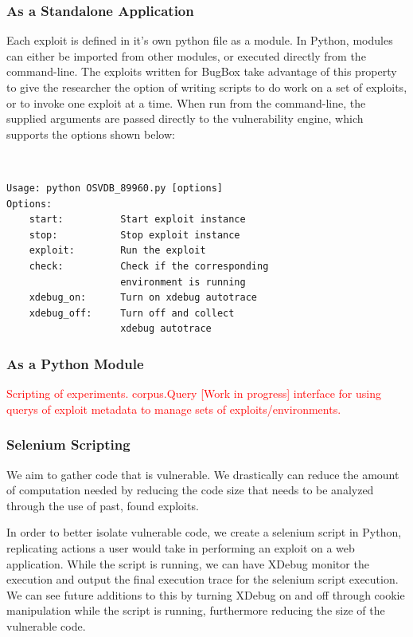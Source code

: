 \documentclass[letterpaper,twocolumn,10pt]{article}
\begin{document}
\subsubsection{As a Standalone Application}

Each exploit is defined in it's own python file as a module. In Python, modules can either be imported from other modules, or executed directly from the command-line. The exploits written for BugBox take advantage of this property to give the researcher the option of writing scripts to do work on a set of exploits, or to invoke one exploit at a time. When run from the command-line, the supplied arguments are passed directly to the vulnerability engine, which supports the options shown below: 

{\tt \small
\begin{verbatim}
Usage: python OSVDB_89960.py [options]
Options:
    start:          Start exploit instance
    stop:           Stop exploit instance
    exploit:        Run the exploit
    check:          Check if the corresponding 
                    environment is running
    xdebug_on:      Turn on xdebug autotrace
    xdebug_off:     Turn off and collect 
                    xdebug autotrace
\end{verbatim}
}

\subsubsection{As a Python Module}
\textcolor{red}{
Scripting of experiments. corpus.Query [Work in progress] interface for using querys of exploit metadata to manage sets of exploits/environments. 
}


\subsubsection{Selenium Scripting}

We aim to gather code that is vulnerable.  We drastically can reduce the amount of computation needed by reducing the code size that needs to be analyzed through the use of past, found exploits.  

In order to better isolate vulnerable code, we create a selenium script in Python, replicating actions a user would take in performing an exploit on a web application.  While the script is running, we can have XDebug monitor the execution and output the final execution trace for the selenium script execution.  We can see future additions to this by turning XDebug on and off through cookie manipulation while the script is running, furthermore reducing the size of the vulnerable code.
\end{document}
